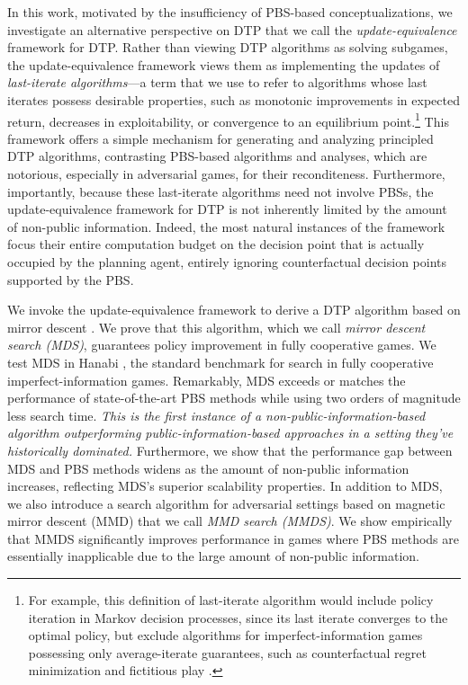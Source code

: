 \documentclass{article} %
\theoremstyle{plain}
\theoremstyle{definition}
\theoremstyle{remark}
\begin{document}
In this work, motivated by the insufficiency of PBS-based conceptualizations, we investigate an alternative perspective on DTP that we call the \emph{update-equivalence} framework for DTP.
Rather than viewing DTP algorithms as solving subgames, the update-equivalence framework views them as implementing the updates of \textit{last-iterate algorithms}---a term that we use to refer to algorithms whose last iterates possess desirable properties, such as monotonic improvements in expected return, decreases in exploitability, or convergence to an equilibrium point.\footnote{For example, this definition of last-iterate algorithm would include policy iteration in Markov decision processes, since its last iterate converges to the optimal policy, but exclude algorithms for imperfect-information games possessing only average-iterate guarantees, such as counterfactual regret minimization \citep{cfr}
and fictitious play \citep{brown:fp1951}.}
This framework offers a simple mechanism for generating and analyzing principled DTP algorithms, contrasting PBS-based algorithms and analyses, which are notorious, especially in adversarial games, for their reconditeness.
Furthermore, importantly, because these last-iterate algorithms need not involve PBSs, the update-equivalence framework for DTP is not inherently limited by the amount of non-public information.
Indeed, the most natural instances of the framework focus their entire computation budget on the decision point that is actually occupied by the planning agent, entirely ignoring counterfactual decision points supported by the PBS.

We invoke the update-equivalence framework to derive a DTP algorithm based on mirror descent \citep{nemirovski1983problem,BECK2003167}.
We prove that this algorithm, which we call \emph{mirror descent search (MDS)}, guarantees policy improvement in fully cooperative games.
We test MDS in Hanabi \citep{BARD2020103216}, the standard benchmark for search in fully cooperative imperfect-information games.
Remarkably, MDS exceeds or matches the performance of state-of-the-art PBS methods while using two orders of magnitude less search time.
\emph{This is the first instance of a non-public-information-based algorithm outperforming public-information-based approaches in a setting they've historically dominated.}
Furthermore, we show that the performance gap between MDS and PBS methods widens as the amount of non-public information increases, reflecting MDS's superior scalability properties.
In addition to MDS, we also introduce a search algorithm for adversarial settings based on magnetic mirror descent (MMD) \citep{mmd} that we call \emph{MMD search (MMDS)}.
We show empirically that MMDS significantly improves performance in games where PBS methods are essentially inapplicable due to the large amount of non-public information.
\end{document}
